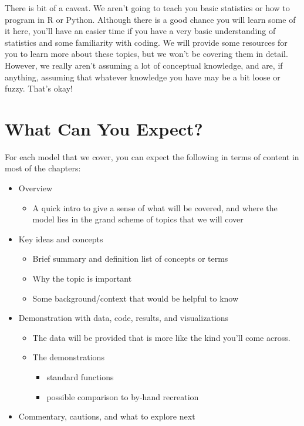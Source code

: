 \documentclass[
  letterpaper,
]{krantz}
\providecommand{\tightlist}{%
  \setlength{\itemsep}{0pt}\setlength{\parskip}{0pt}}\usepackage{longtable,booktabs,array}
\begin{document}
There is bit of a caveat. We aren't going to teach you basic statistics
or how to program in R or Python. Although there is a good chance you
will learn some of it here, you'll have an easier time if you have a
very basic understanding of statistics and some familiarity with coding.
We will provide some resources for you to learn more about these topics,
but we won't be covering them in detail. However, we really aren't
assuming a lot of conceptual knowledge, and are, if anything, assuming
that whatever knowledge you have may be a bit loose or fuzzy. That's
okay!

\section*{What Can You Expect?}\label{what-can-you-expect}


For each model that we cover, you can expect the following in terms of
content in most of the chapters:

\begin{itemize}
\tightlist
\item
  Overview

  \begin{itemize}
  \tightlist
  \item
    A quick intro to give a sense of what will be covered, and where the
    model lies in the grand scheme of topics that we will cover
  \end{itemize}
\item
  Key ideas and concepts

  \begin{itemize}
  \tightlist
  \item
    Brief summary and definition list of concepts or terms
  \item
    Why the topic is important
  \item
    Some background/context that would be helpful to know
  \end{itemize}
\item
  Demonstration with data, code, results, and visualizations

  \begin{itemize}
  \tightlist
  \item
    The data will be provided that is more like the kind you'll come
    across.
  \item
    The demonstrations

    \begin{itemize}
    \tightlist
    \item
      standard functions
    \item
      possible comparison to by-hand recreation
    \end{itemize}
  \end{itemize}
\item
  Commentary, cautions, and what to explore next
\end{itemize}
\end{document}
